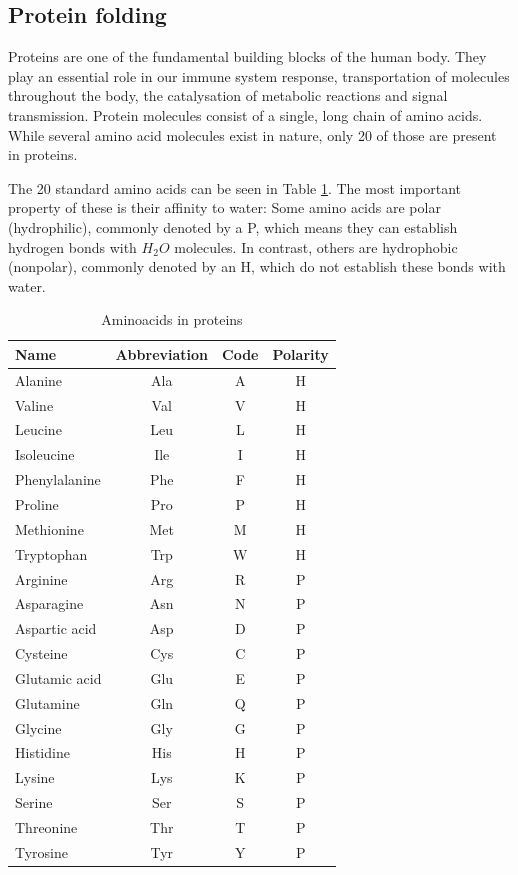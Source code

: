 \subsection{Protein folding}

Proteins are one of the fundamental building blocks of the human body. They play an essential role in our immune system response, transportation of molecules throughout the body, the catalysation of metabolic reactions and signal transmission. Protein molecules consist of a single, long chain of amino acids. While several amino acid molecules exist in nature, only 20 of those are present in proteins.\cite{BockenhauerAlgoBioinfo}

The 20 standard amino acids can be seen in Table \ref{aminoacids20}. The most important property of these is their affinity to water: Some amino acids are polar (hydrophilic), commonly denoted by a P, which means they can establish hydrogen bonds with $H_2O$ molecules. In contrast, others are hydrophobic (nonpolar), commonly denoted by an H, which do not establish these bonds with water.

\begin{table}[H]
\centering
\begin{tabular}{|l|ccc|}
\hline
Name          & Abbreviation & Code & Polarity \\
\hline
Alanine       & Ala & A & H \\
Valine        & Val & V & H \\
Leucine       & Leu & L & H \\
Isoleucine    & Ile & I & H \\
Phenylalanine & Phe & F & H \\
Proline       & Pro & P & H \\
Methionine    & Met & M & H \\
Tryptophan    & Trp & W & H \\
\hline
Arginine      & Arg & R & P \\
Asparagine    & Asn & N & P \\
Aspartic acid & Asp & D & P \\
Cysteine      & Cys & C & P \\
Glutamic acid & Glu & E & P \\
Glutamine     & Gln & Q & P \\
Glycine       & Gly & G & P \\
Histidine     & His & H & P \\
Lysine        & Lys & K & P \\
Serine        & Ser & S & P \\
Threonine     & Thr & T & P \\
Tyrosine      & Tyr & Y & P \\
\hline
\end{tabular}
\caption{Aminoacids in proteins}
\label{aminoacids20}
\end{table}

